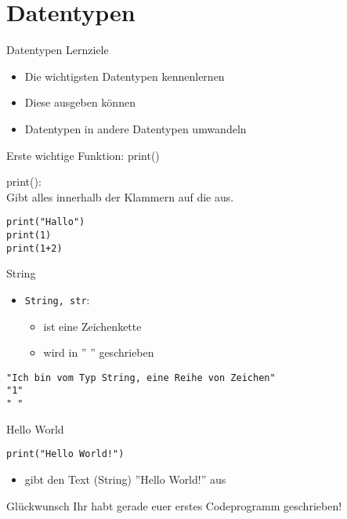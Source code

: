 \section{Datentypen}

\begin{frame}[fragile]{Datentypen}
Lernziele
\begin{itemize}
	\item Die wichtigsten Datentypen kennenlernen
	\item Diese ausgeben können
	\item Datentypen in andere Datentypen umwandeln
\end{itemize}
\end{frame}

\begin{frame}[fragile]{Erste wichtige Funktion: print()}

	print():\\
	Gibt alles innerhalb der Klammern auf die aus.

\begin{lstlisting}
print("Hallo")
print(1)
print(1+2)
\end{lstlisting}
\end{frame}



\begin{frame}[fragile]{String}
\begin{itemize}
    \item \texttt{String, str}: 
     	\begin{itemize}
     		\item ist eine Zeichenkette
     		\item wird in '' '' geschrieben
     	\end{itemize}
     \end{itemize}
    \begin{lstlisting}
"Ich bin vom Typ String, eine Reihe von Zeichen"
"1"
" "
    \end{lstlisting}
\end{frame}

\begin{frame}[fragile]{Hello World}
\begin{lstlisting}
print("Hello World!")
\end{lstlisting}
\begin{itemize}
	\item gibt den Text (String) ''Hello World!'' aus
\end{itemize}
\begin{exampleblock}{Glückwunsch}
	Ihr habt gerade euer erstes Codeprogramm geschrieben!
\end{exampleblock}
\end{frame}


